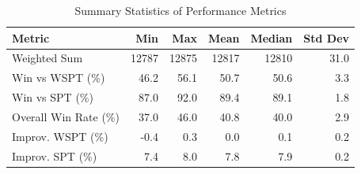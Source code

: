 \begin{table}[htbp]%
\centering%
\begin{tabular}{lrrrrr}%
\toprule%
\textbf{Metric}&\textbf{Min}&\textbf{Max}&\textbf{Mean}&\textbf{Median}&\textbf{Std Dev}\\%
\midrule%
Weighted Sum&12787&12875&12817&12810&31.0\\%
Win vs WSPT (\%)&46.2&56.1&50.7&50.6&3.3\\%
Win vs SPT (\%)&87.0&92.0&89.4&89.1&1.8\\%
Overall Win Rate (\%)&37.0&46.0&40.8&40.0&2.9\\%
Improv. WSPT (\%)&-0.4&0.3&0.0&0.1&0.2\\%
Improv. SPT (\%)&7.4&8.0&7.8&7.9&0.2\\%
\bottomrule%
\end{tabular}%
\caption{Summary Statistics of Performance Metrics}%
\label{tab:metrics}%
\end{table}